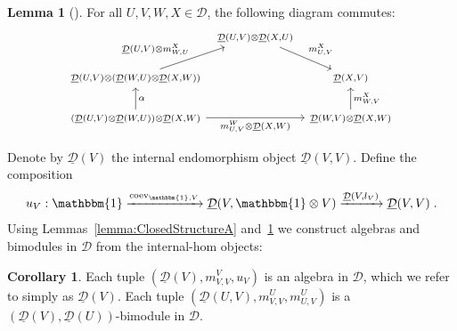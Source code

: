 \documentclass[12pt,dvipsnames]{article}
\numberwithin{equation}{section}
\theoremstyle{definition}
\newtheorem{corollary}[definition]{Corollary}
\newtheorem{lemma}[definition]{Lemma}
\newcommand{\cat}[1]{\mathcal{#1}}
\newcommand{\1}{\ensuremath{\mathbbm{1}}}
\DeclareMathOperator{\coev}{coev}
\begin{document}
\begin{lemma}[{\cite[Thm.\,6.4, proof of (iii)]{EK66}}]\label{lemma:ClosedStructureB}
For all $U,V,W,X\in\cat{D}$, the following diagram commutes:
    \begin{equation}
        \begin{tikzcd}[column sep=0.5em]
            & {\scriptstyle \underline{\cat{D}}(U,V)\otimes\underline{\cat{D}}(X,U)} & \\
            {\scriptstyle \underline{\cat{D}}(U,V)\otimes(\underline{\cat{D}}(W,U)\otimes\underline{\cat{D}}(X,W))} && {\scriptstyle \underline{\cat{D}}(X,V) } \\
            {\scriptstyle (\underline{\cat{D}}(U,V)\otimes\underline{\cat{D}}(W,U))\otimes\underline{\cat{D}}(X,W) } && {\scriptstyle \underline{\cat{D}}(W,V)\otimes\underline{\cat{D}}(X,W)}
            \arrow["{\underline{\cat{D}}(U,V)\otimes m_{W,U}^X}", from=2-1, to=1-2]\arrow["{m_{U,V}^X}", from=1-2, to=2-3]
            \arrow["{\alpha}"', from=3-1, to=2-1]\arrow["{m_{U,V}^W\otimes\underline{\cat{D}}(X,W)}"', from=3-1, to=3-3]\arrow["{m_{W,V}^X}"', from=3-3, to=2-3]
        \end{tikzcd}
    \end{equation}
\end{lemma}

Denote by $\underline{\cat{D}}(V)$ the internal endomorphism object $\underline{\cat{D}}(V,V)$. Define the composition
\begin{equation}
    u_V:\1\xrightarrow{\coev_{\1,V}}\underline{\cat{D}}(V,\1\otimes V)\xrightarrow{\underline{\cat{D}}(V,l_V)} \underline{\cat{D}}(V,V)\;.
\end{equation}
Using Lemmas~\ref{lemma:ClosedStructureA} and~\ref{lemma:ClosedStructureB} we construct algebras and bimodules in $\cat{D}$ from the internal-hom objects:
\begin{corollary}\label{cor:AlgFromClosed}
     Each tuple $(\underline{\cat{D}}(V),m_{V,V}^V,u_V)$ is an algebra in $\cat{D}$, which we refer to simply as $\underline{\cat{D}}(V)$. Each tuple $(\underline{\cat{D}}(U,V),m_{V,V}^U,m_{U,V}^U)$ is a $(\underline{\cat{D}}(V),\underline{\cat{D}}(U))$-bimodule in $\cat{D}$.
\end{corollary}
\end{document}
